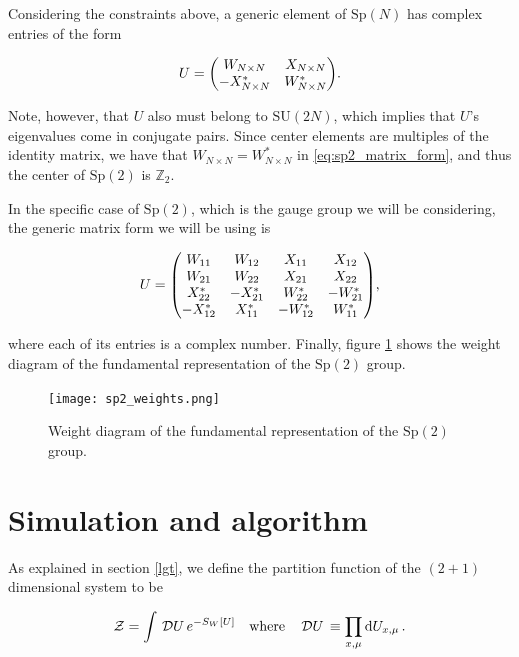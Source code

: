 \documentclass[reqno,12pt]{article}
\numberwithin{equation}{section}
\newcommand{\D}[1]{\,\mathcal{D}#1\,}
\newcommand{\SU}{\mathrm{SU}}
\newcommand{\Sp}{\mathrm{Sp}}
\begin{document}
Considering the constraints above, a generic element of $\Sp(N)$ has complex entries of the form

\begin{equation} \label{eq:sp2_matrix_form}
	U = \mqty(W_{N \times N} & X_{N \times N} \\ -X_{N \times N}^* & W_{N \times N}^*).
\end{equation}

Note, however, that $U$ also must belong to $\SU(2N)$, which implies that $U$'s eigenvalues come in conjugate pairs. Since center elements
are multiples of the identity matrix, we have that $W_{N \times N} = W_{N \times N}^*$ in \eqref{eq:sp2_matrix_form}, 
and thus the center of $\Sp(2)$ is $\mathbb{Z}_2$.

In the specific case of $\Sp(2)$, which is the gauge group we will be considering, the generic matrix form we
will be using is

\begin{equation}
	U = \mqty(
		W_{11} & W_{12} & X_{11} & X_{12} \\
		W_{21} & W_{22} & X_{21} & X_{22} \\
		X^*_{22} & -X^*_{21} & W^*_{22} & -W^*_{21} \\
		-X^*_{12} & X^*_{11} & -W^*_{12} & W^*_{11}
	),
\end{equation}

where each of its entries is a complex number. Finally, figure \ref{fig:sp2weights} shows the weight diagram of the
fundamental representation of the $\Sp(2)$ group. 

\begin{figure}[h]
	\centering
	\texttt{[image: sp2\_weights.png]}
	\caption[$\Sp(2)$ weight diagram]{Weight diagram of the fundamental representation of the $\Sp(2)$ group.}
\label{fig:sp2weights}
\end{figure}

\newpage

\section{Simulation and algorithm} \label{simulation}

As explained in section \ref{lgt}, we define the partition function of the $(2+1)$ dimensional system to be

\begin{equation}
	\mathcal{Z} = \int \D{U} e^{-S_W[U]} \qq{where} \D U \equiv \prod_{x,\mu} \dd{U_{x,\mu}}.
\end{equation}
\end{document}
